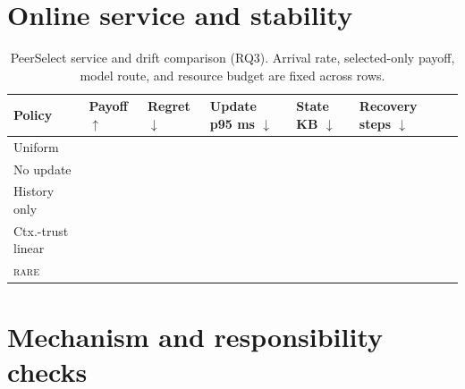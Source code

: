\documentclass[sigconf,anonymous]{aamas}
\newcommand{\blank}{\textemdash}
\newcommand{\rare}{\textsc{rare}}
\newcommand{\metric}[1]{\makecell[c]{#1}}
\begin{document}
\section{Online service and stability}

\begin{table}[t]
\centering
\small
\setlength{\tabcolsep}{4pt}
\renewcommand{\arraystretch}{1.12}
\begin{tabular}{l*{6}{>{\centering\arraybackslash}p{}}}
\toprule
Policy & \metric{Payoff\\$\uparrow$} & \metric{Regret\\$\downarrow$} & \metric{Update p95\\ms $\downarrow$} & \metric{State\\KB $\downarrow$} & \metric{Recovery\\steps $\downarrow$} & \metric{Streams}\\
\midrule
Uniform & \blank & \blank & \blank & \blank & \blank & \blank\\
No update & \blank & \blank & \blank & \blank & \blank & \blank\\
History only & \blank & \blank & \blank & \blank & \blank & \blank\\
Ctx.-trust linear & \blank & \blank & \blank & \blank & \blank & \blank\\
\rare{} & \blank & \blank & \blank & \blank & \blank & \blank\\
\bottomrule
\end{tabular}
\caption{PeerSelect service and drift comparison (RQ3). Arrival rate, selected-only payoff, model route, and resource budget are fixed across rows.}
\label{tab:body-service}
\end{table}

\section{Mechanism and responsibility checks}
\end{document}
